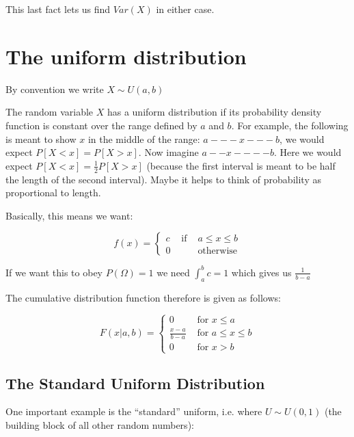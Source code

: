 \documentclass[12pt]{extbook}
\begin{document}
This last fact lets us find $Var(X)$ in either case.





\section{The uniform distribution}

{\color{green}By convention we write $X \sim U(a, b)$}


The random variable $X$ has a uniform distribution if its probability density function is constant over the range defined by $a$ and $b$.   For example, the following is meant to show $x$ in the middle of the range: $a---x---b$, we would expect $P[X<x]=P[X>x]$.   Now imagine $a--x----b$.  Here we would expect $P[X<x] =  \frac{1}{2}P[X>x]$ (because the first interval is meant to be half the length of the second interval).   Maybe it helps to think of probability as proportional to length.

Basically, this means we want:

\begin{displaymath}
f(x) = \left\{ \begin{array}{rrr} c & \mbox{ if } & a \leq x \leq b\\
0 & & \mbox{otherwise} \end{array} \right.
\end{displaymath}

If we want this to obey $P(\Omega)=1$ we need $\int_a^bc=1$ which gives us $\frac{1}{b-a}$

The cumulative distribution function therefore is given as follows:

\begin{displaymath}
F(x|a,b) = \left\{ \begin{array}{ll} 0 & \mbox{ for }  x \leq a \\
\frac{x-a}{b-a} & \mbox{ for } a \leq x \leq b \\ 
0 & \mbox{ for } x > b \end{array} \right. 
\end{displaymath}


\subsection{The Standard Uniform Distribution}

One important example is the ``standard'' uniform, i.e. where $U \sim U(0,1)$ (the building block of all other random numbers):
\end{document}

